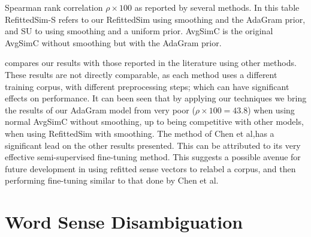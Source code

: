 \documentclass{sig-alternate}
\begin{document}
\begin{table}
	\begin{adjustbox}{max width=\columnwidth}
	\end{adjustbox}
	\caption{Spearman rank correlation $\rho \times 100$  as reported by several methods\label{swscEvery}. In this table RefittedSim-S refers to our RefittedSim using smoothing and the AdaGram prior, and SU to using smoothing and a uniform prior. AvgSimC is the original AvgSimC without smoothing but with the AdaGram prior.}
\end{table}

 compares our results with those reported in the literature using other methods. These results are not directly comparable, as each method uses a different training corpus, with different preprocessing steps;  which can have significant effects on performance.
It can been seen that by applying our techniques we bring the results of our AdaGram model from very poor ($\rho \times 100 = 43.8$) when using normal AvgSimC without smoothing, up to being competitive with other models, when using RefittedSim with smoothing. The method of Chen et al\parencite{Chen2014},has a significant lead on the other results presented. This can be attributed to its very effective semi-supervised fine-tuning method. This suggests a possible avenue for future development in using refitted sense vectors to  relabel a corpus, and then performing fine-tuning similar to that done by Chen et al.



\section{Word Sense Disambiguation}\label{lexicalWSD}
\end{document}
